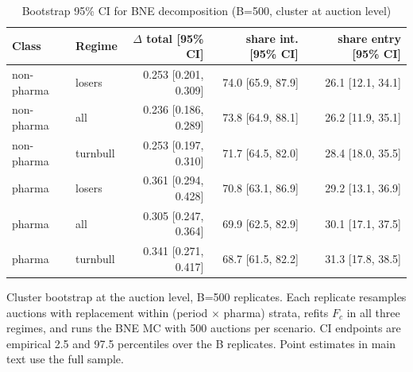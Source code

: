 \begin{table}[htbp]
\centering
\begin{threeparttable}
\caption{Bootstrap 95\% CI for BNE decomposition (B=500, cluster at auction level)}
\label{tab:v3_bootstrap_ci}
\small
\begin{tabular}{llrrr}
\toprule
Class & Regime & $\Delta$ total [95\% CI] & share int. [95\% CI] & share entry [95\% CI] \\
\midrule
non-pharma & losers & 0.253 [0.201, 0.309] & 74.0 [65.9, 87.9] & 26.1 [12.1, 34.1] \\
non-pharma & all & 0.236 [0.186, 0.289] & 73.8 [64.9, 88.1] & 26.2 [11.9, 35.1] \\
non-pharma & turnbull & 0.253 [0.197, 0.310] & 71.7 [64.5, 82.0] & 28.4 [18.0, 35.5] \\
pharma & losers & 0.361 [0.294, 0.428] & 70.8 [63.1, 86.9] & 29.2 [13.1, 36.9] \\
pharma & all & 0.305 [0.247, 0.364] & 69.9 [62.5, 82.9] & 30.1 [17.1, 37.5] \\
pharma & turnbull & 0.341 [0.271, 0.417] & 68.7 [61.5, 82.2] & 31.3 [17.8, 38.5] \\
\bottomrule
\end{tabular}
\begin{tablenotes}\footnotesize
\item Cluster bootstrap at the auction level, B=500 replicates.
Each replicate resamples auctions with replacement within
(period $\times$ pharma) strata, refits $F_c$ in all three
regimes, and runs the BNE MC with 500 auctions per scenario.
CI endpoints are empirical 2.5 and 97.5 percentiles over the
B replicates. Point estimates in main text use the full sample.
\end{tablenotes}
\end{threeparttable}
\end{table}
